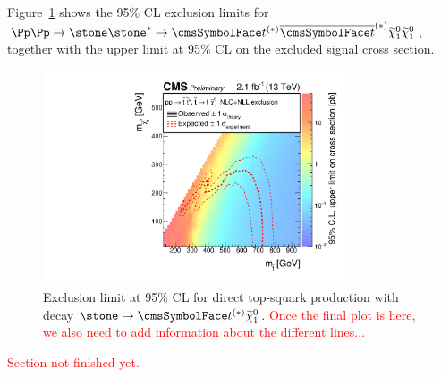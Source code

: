 Figure~\ref{fig:limits:T2tt} shows the 95\% CL exclusion limits for $\Pp\Pp\to\stone\stone^*\to \PQt^{(*)}\PAQt^{(*)}\PSGczDo\PSGczDo$, together with the upper limit at 95\% CL on the excluded signal cross section.
\begin{figure}[htb]
\centering
\includegraphics[width=0.8\textwidth]{plots_stop/T2ttstopXSEC.pdf}
\caption{\label{fig:limits:T2tt}Exclusion limit at 95\% CL for direct top-squark production with decay $\stone\to\PQt^{(*)}\PSGczDo$. \textcolor{red}{Once the final plot is here, we also need to add information about the different lines...} }
\end{figure}

\textcolor{red}{Section not finished yet.}
